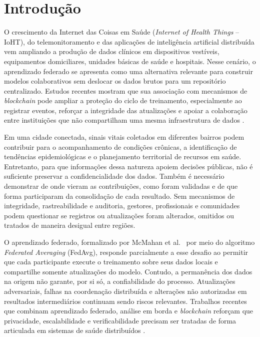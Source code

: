 \documentclass[12pt]{article}
\begin{document}
\section{Introdução}

O crescimento da Internet das Coisas em Saúde (\textit{Internet of Health Things} -- IoHT), do telemonitoramento e das aplicações de inteligência artificial distribuída vem ampliando a produção de dados clínicos em dispositivos vestíveis, equipamentos domiciliares, unidades básicas de saúde e hospitais. Nesse cenário, o aprendizado federado se apresenta como uma alternativa relevante para construir modelos colaborativos sem deslocar os dados brutos para um repositório centralizado. Estudos recentes mostram que sua associação com mecanismos de \textit{blockchain} pode ampliar a proteção do ciclo de treinamento, especialmente ao registrar eventos, reforçar a integridade das atualizações e apoiar a colaboração entre instituições que não compartilham uma mesma infraestrutura de dados \cite{khan2025advancing,wang2026securing}.

Em uma cidade conectada, sinais vitais coletados em diferentes bairros podem contribuir para o acompanhamento de condições crônicas, a identificação de tendências epidemiológicas e o planejamento territorial de recursos em saúde. Entretanto, para que informações dessa natureza apoiem decisões públicas, não é suficiente preservar a confidencialidade dos dados. Também é necessário demonstrar de onde vieram as contribuições, como foram validadas e de que forma participaram da consolidação de cada resultado. Sem mecanismos de integridade, rastreabilidade e auditoria, gestores, profissionais e comunidades podem questionar se registros ou atualizações foram alterados, omitidos ou tratados de maneira desigual entre regiões.

O aprendizado federado, formalizado por McMahan et al.~\cite{mcmahan2017communication} por meio do algoritmo \textit{Federated Averaging} (FedAvg), responde parcialmente a esse desafio ao permitir que cada participante execute o treinamento sobre seus dados locais e compartilhe somente atualizações do modelo. Contudo, a permanência dos dados na origem não garante, por si só, a confiabilidade do processo. Atualizações adversariais, falhas na coordenação distribuída e alterações não autorizadas em resultados intermediários continuam sendo riscos relevantes. Trabalhos recentes que combinam aprendizado federado, análise em borda e \textit{blockchain} reforçam que privacidade, escalabilidade e verificabilidade precisam ser tratadas de forma articulada em sistemas de saúde distribuídos \cite{munusamy2025blockchain,wang2026securing}.
\end{document}
